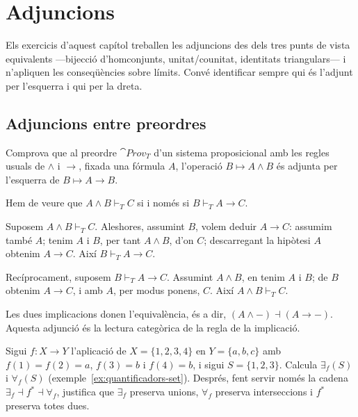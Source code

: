 \chapter[Adjuncions]{Adjuncions}

Els exercicis d'aquest capítol treballen les adjuncions des dels tres punts de vista equivalents ---bijecció d'homconjunts, unitat/counitat, identitats triangulars--- i n'apliquen les conseqüències sobre límits. Convé identificar sempre qui és l'adjunt per l'esquerra i qui per la dreta.

\section{Adjuncions entre preordres}

\begin{exercici}
Comprova que al preordre $\cat{Prov}_T$ d'un sistema proposicional amb les regles usuals de $\wedge$ i $\to$, fixada una fórmula $A$, l'operació $B\mapsto A\wedge B$ és adjunta per l'esquerra de $B\mapsto A\to B$.
\end{exercici}

\begin{solucio}
Hem de veure que $A\wedge B\vdash_T C$ si i només si $B\vdash_T A\to C$. 

Suposem $A\wedge B\vdash_T C$. Aleshores, assumint $B$, volem deduir $A\to C$: assumim també $A$; tenim $A$ i $B$, per tant $A\wedge B$, d'on $C$; descarregant la hipòtesi $A$ obtenim $A\to C$. Així $B\vdash_T A\to C$.

Recíprocament, suposem $B\vdash_T A\to C$. Assumint $A\wedge B$, en tenim $A$ i $B$; de $B$ obtenim $A\to C$, i amb $A$, per modus ponens, $C$. Així $A\wedge B\vdash_T C$.

Les dues implicacions donen l'equivalència, és a dir, $(A\wedge-)\dashv(A\to-)$. Aquesta adjunció és la lectura categòrica de la regla de la implicació.
\end{solucio}

\begin{exercici}\label{pr-quantificadors-calcul}
Sigui $f\colon X\to Y$ l'aplicació de $X=\{1,2,3,4\}$ en $Y=\{a,b,c\}$ amb $f(1)=f(2)=a$, $f(3)=b$ i $f(4)=b$, i sigui $S=\{1,2,3\}$. Calcula $\exists_f(S)$ i $\forall_f(S)$ (exemple~\ref{ex:quantificadors-set}). Després, fent servir només la cadena $\exists_f\dashv f^{*}\dashv\forall_f$, justifica que $\exists_f$ preserva unions, $\forall_f$ preserva interseccions i $f^{*}$ preserva totes dues.
\end{exercici}

